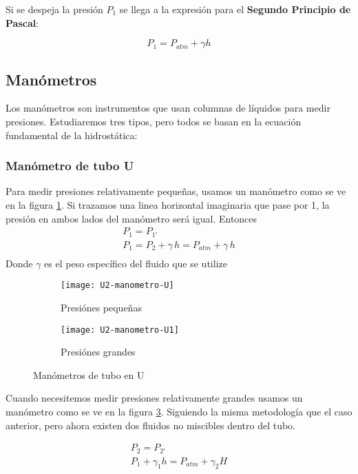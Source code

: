 Si se despeja la presión $P_1$ se llega a la expresión para el \textbf{Segundo Principio de Pascal}:

\begin{equation}
	P_1 = P_{atm} + \gamma h
\end{equation}

\subsection{Manómetros} %
Los manómetros son instrumentos que usan columnas de líquidos para medir presiones. Estudiaremos tres tipos, pero todos se basan en la ecuación fundamental de la hidrostática:

\subsubsection{Manómetro de tubo U}
Para medir presiones relativamente pequeñas, usamos un manómetro como se ve en la figura \ref{fig:manometro-u}. Si trazamos una linea horizontal imaginaria que pase por 1, la presión en ambos lados del manómetro será igual. Entonces
\begin{gather}
	P_{1} = P_{1'} \\
	P_{1} = P_{2} + \gamma \, h = P_{atm} + \gamma \, h\\
\end{gather}
Donde $\gamma$ es el peso específico del fluido que se utilize

\begin{figure}[h]
	\centering
	\begin{subfigure}[b]{.45\linewidth}
		\flushright
		\texttt{[image: U2-manometro-U]}
		\caption{Presiónes pequeñas}
		\label{fig:manometro-u}
	\end{subfigure}
	\begin{subfigure}[b]{.45\linewidth}
		\flushleft
		\texttt{[image: U2-manometro-U1]}
		\caption{Presiónes grandes}
		\label{fig:manometro-u2}
	\end{subfigure}
	\caption{Manómetros de tubo en U}
\end{figure}

Cuando necesitemos medir presiones relativamente grandes usamos un manómetro como se ve en la figura \ref{fig:manometro-u2}. Siguiendo la misma metodología que el caso anterior, pero ahora existen dos fluidos no miscibles dentro del tubo.

\begin{gather}
	P_{2} = P_{2'}\\
	P_{1} + \gamma_{1} h = P_{atm} + \gamma_{2} H 
\end{gather}

